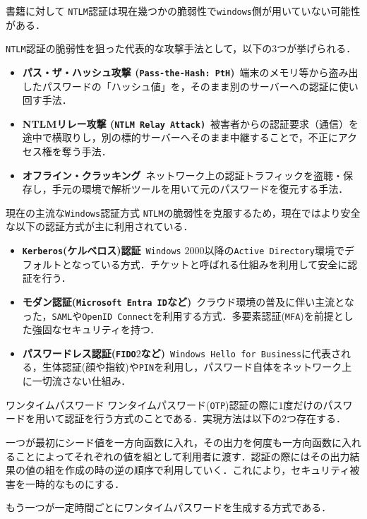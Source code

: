 \documentclass[11pt, aspectratio=169]{beamer}
\begin{document}
\begin{frame}{書籍に対して}
   \texttt{NTLM}認証は現在幾つかの脆弱性で\texttt{windows}側が用いていない可能性がある．

  \texttt{NTLM}認証の脆弱性を狙った代表的な攻撃手法として，以下の3つが挙げられる．

  \begin{itemize}
    \item \textbf{パス・ザ・ハッシュ攻撃 (\texttt{Pass-the-Hash: PtH})}\
    端末のメモリ等から盗み出したパスワードの「ハッシュ値」を，そのまま別のサーバーへの認証に使い回す手法．
    \item \textbf{NTLMリレー攻撃 (\texttt{NTLM Relay Attack)}}\
    被害者からの認証要求（通信）を途中で横取りし，別の標的サーバーへそのまま中継することで，不正にアクセス権を奪う手法．
    \item \textbf{オフライン・クラッキング}\
    ネットワーク上の認証トラフィックを盗聴・保存し，手元の環境で解析ツールを用いて元のパスワードを復元する手法．
  \end{itemize}
\end{frame}

\begin{frame}{現在の主流な\texttt{Windows}認証方式}
  \texttt{NTLM}の脆弱性を克服するため，現在ではより安全な以下の認証方式が主に利用されている．

  \begin{itemize}
    \item \textbf{\texttt{Kerberos}(ケルベロス)認証}\
    \texttt{Windows} $2000$以降の\texttt{Active Directory}環境でデフォルトとなっている方式．チケットと呼ばれる仕組みを利用して安全に認証を行う．
    \item \textbf{モダン認証(\texttt{Microsoft Entra ID}など)}\
    クラウド環境の普及に伴い主流となった，\texttt{SAML}や\texttt{OpenID Connect}を利用する方式．多要素認証(\texttt{MFA})を前提とした強固なセキュリティを持つ．
    \item \textbf{パスワードレス認証(\texttt{FIDO}$2$など)}\
    \texttt{Windows Hello for Business}に代表される，生体認証(顔や指紋)や\texttt{PIN}を利用し，パスワード自体をネットワーク上に一切流さない仕組み．
  \end{itemize}
\end{frame}

\begin{frame}{ワンタイムパスワード}
ワンタイムパスワード(\texttt{OTP})認証の際に$1$度だけのパスワードを用いて認証を行う方式のことである．実現方法は以下の$2$つ存在する．

\vspace{1em}

一つが最初にシード値を一方向函数に入れ，その出力を何度も一方向函数に入れることによってそれぞれの値を組として利用者に渡す．認証の際にはその出力結果の値の組を作成の時の逆の順序で利用していく．これにより，セキュリティ被害を一時的なものにする．

もう一つが一定時間ごとにワンタイムパスワードを生成する方式である．
\end{frame}
\end{document}
